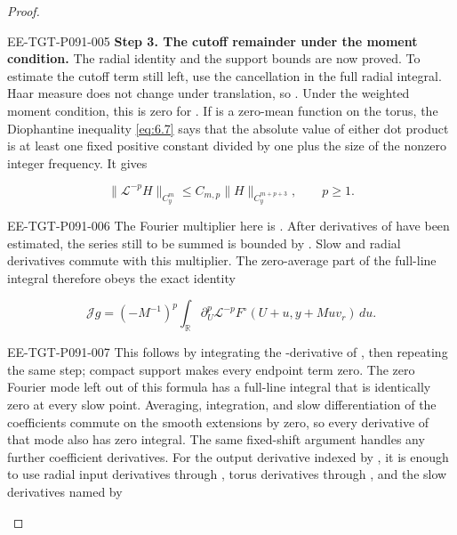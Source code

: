 \begin{proof}
\begin{EESegment}{EE-TGT-P091-005}
\noindent\textbf{Step 3. The cutoff remainder under the moment condition.} The radial identity and
the support bounds are now proved. To estimate the cutoff term still left, use the cancellation in
the full radial integral. Haar measure does not change under translation, so
. Under the weighted
moment condition, this is zero for . If
 is a zero-mean function on the torus, the Diophantine inequality
\eqref{eq:6.7} says that the absolute value of either dot product is at least one fixed positive
constant divided by one plus the size of the nonzero integer frequency. It gives
\end{EESegment}
\begin{equation}
\|\mathcal L^{-p}H\|_{C_y^m}\le C_{m,p}\|H\|_{C_y^{m+p+3}},
\qquad p\ge1.
\tag{8.10}\label{eq:8.10}
\end{equation}
\begin{EESegment}{EE-TGT-P091-006}
The Fourier multiplier here is
. After
 derivatives of  have been estimated, the
series still to be summed is bounded by
. Slow and radial derivatives commute
with this multiplier. The zero-average part of the full-line integral therefore obeys the exact
identity
\end{EESegment}
\[
\mathcal Jg=(-M^{-1})^p\int_{\mathbb R}\partial_U^p\mathcal L^{-p}F^\circ
   (U+u,y+Muv_r)\,du.
\]
\begin{EESegment}{EE-TGT-P091-007}
This follows by integrating the -derivative of
, then repeating the same step; compact support makes
every endpoint term zero. The zero Fourier mode left out of this formula has a full-line
%
integral that is identically zero at every slow point. Averaging, integration, and slow
differentiation of the coefficients commute on the smooth extensions by zero, so every derivative
of that mode also has zero integral. The same fixed-shift argument handles any further coefficient
derivatives. For the output derivative indexed by , it is enough to use
radial input derivatives through , torus derivatives through
, and the slow derivatives named by

\end{EESegment}
\end{proof}
